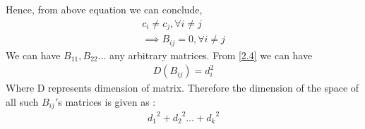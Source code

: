 \documentclass[journal,12pt,twocolumn]{IEEEtran}
\begin{document}
 Hence, from above  equation  we can conclude,
 \begin{align}
 c_i \neq c_j, \forall i \neq j\\
 \implies B_{ij} = 0, \forall i \neq j
 \end{align}
We can have $B_{11}, B_{22} \dots$ any arbitrary matrices. From \eqref{2.4} we can have  
\begin{align}
 D(B_{ij}) = d_i^{2} 
 \end{align}
Where D  represents dimension of matrix. Therefore the dimension of the space of all such $B_{ij}{'}$s matrices is given as :
\begin{align}
{d_1}^2 + {d_2}^2 \dots + {d_k}^2
\end{align}
\end{document}

